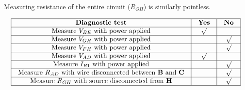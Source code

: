 Measuring resistance of the entire circuit ($R_{GH}$) is similarly pointless.



$$\vbox{\offinterlineskip
\halign{\strut
\vrule \quad\hfil # \ \hfil & 
\vrule \quad\hfil # \ \hfil & 
\vrule \quad\hfil # \ \hfil \vrule \cr
\noalign{\hrule}
%
{\bf Diagnostic test} & {\bf Yes} & {\bf No} \cr
%
\noalign{\hrule}
%
Measure $V_{BE}$ with power applied & $\surd$ &  \cr
%
\noalign{\hrule}
%
Measure $V_{GH}$ with power applied &  & $\surd$ \cr
%
\noalign{\hrule}
%
Measure $V_{FH}$ with power applied &  & $\surd$ \cr
%
\noalign{\hrule}
%
Measure $V_{AD}$ with power applied & $\surd$ &  \cr
%
\noalign{\hrule}
%
Measure $I_{R1}$ with power applied &  & $\surd$ \cr
%
\noalign{\hrule}
%
Measure $R_{AD}$ with wire disconnected between {\bf B} and {\bf C} &  & $\surd$ \cr
%
\noalign{\hrule}
%
Measure $R_{GH}$ with source disconnected from {\bf H} &  & $\surd$ \cr
%
\noalign{\hrule}
} %
}$$ %





